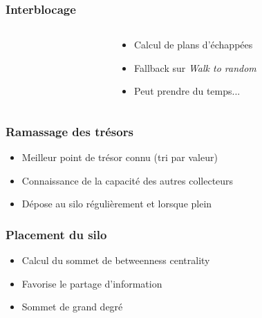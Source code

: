 \documentclass{beamer}
\newcommand{\vertex}{\node[vertex]}
\begin{document}
\begin{frame}
\frametitle{Interblocage}
\begin{columns}[T]
    \begin{column}{.48\textwidth}
    \center
    \end{column}
    \begin{column}{.48\textwidth}
    \begin{itemize}
        \item Calcul de plans d'échappées
        \item Fallback sur \textit{Walk to random}
        \item Peut prendre du temps...
    \end{itemize}
    \end{column}
\end{columns}
\end{frame}

\begin{frame}
\frametitle{Ramassage des trésors}
\begin{itemize}
    \item Meilleur point de trésor connu (tri par valeur)
    \item Connaissance de la capacité des autres collecteurs
    \item Dépose au silo régulièrement et lorsque plein
\end{itemize}
\end{frame}

\begin{frame}
\frametitle{Placement du silo}
\begin{itemize}
    \item Calcul du sommet de betweenness centrality
    \item Favorise le partage d'information
    \item Sommet de grand degré
\end{itemize}
\end{frame}
\end{document}
